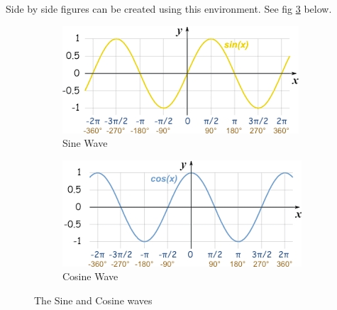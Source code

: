 \noindent Side by side figures can be created using this environment. See fig \ref{wave} below.
\begin{figure}[h!]
	\centering
	\begin{subfigure}[b]{0.4\textwidth}
		\includegraphics[width=\textwidth]{sinewave}
		\caption{Sine Wave}
		\label{fig:1}
	\end{subfigure}
	\hspace{20mm}
	\begin{subfigure}[b]{0.4\textwidth}
		\includegraphics[width=\linewidth]{cosine}
		\caption{Cosine Wave}
		\label{fig:2}
	\end{subfigure}
	\caption{The Sine and Cosine waves}
	\label{wave}
\end{figure}
